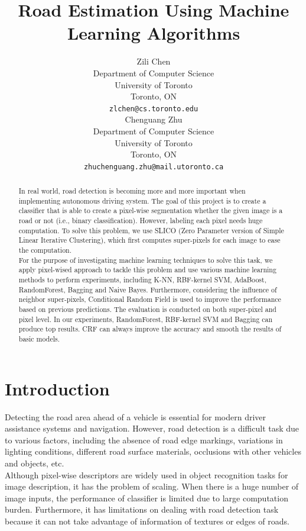 \documentclass{article} %
\title{Road Estimation Using Machine Learning Algorithms}
\author{
Zili Chen\\
Department of Computer Science\\
University of Toronto\\
Toronto, ON\\
\texttt{zlchen@cs.toronto.edu} \\
\And
Chenguang Zhu\\
Department of Computer Science\\
University of Toronto\\
Toronto, ON\\
\texttt{zhuchenguang.zhu@mail.utoronto.ca} \\
}
\begin{document}
\maketitle

\begin{abstract}
In real world, road detection is becoming more and more important when implementing autonomous driving system. The goal of this project is to create a classifier  that is able to create a pixel-wise segmentation whether the given image is a road or not (i.e., binary classification). However, labeling each pixel needs huge computation. To solve this problem, we use SLICO (Zero Parameter version of Simple Linear Iterative Clustering), which first computes super-pixels for each image to ease the computation. \\

For the purpose of investigating machine learning techniques to solve this task, we apply pixel-wised approach to tackle this problem and use various machine learning methods to perform experiments, including K-NN, RBF-kernel SVM, AdaBoost, RandomForest, Bagging and Naive Bayes. Furthermore, considering the influence of neighbor super-pixels, Conditional Random Field is used to improve the performance based on previous predictions. The evaluation is conducted on both super-pixel and pixel level. In our experiments, RandomForest, RBF-kernel SVM and Bagging can produce top results. CRF can always improve the accuracy and smooth the results of basic models. 
\end{abstract}

\section{Introduction}
Detecting the road area ahead of a vehicle is essential for modern driver assistance systems and navigation. However, road detection is a difficult task due to various factors, including the absence of road edge markings, variations in lighting conditions, different road surface materials, occlusions with other vehicles and objects, etc.\\

Although pixel-wise descriptors are widely used in object recognition tasks for image description, it has the problem of scaling. When there is a huge number of image inputs, the performance of classifier is limited  due to large computation burden. Furthermore, it has limitations on dealing with road detection task because it can not take advantage of information of textures or edges of roads. 
\end{document}
